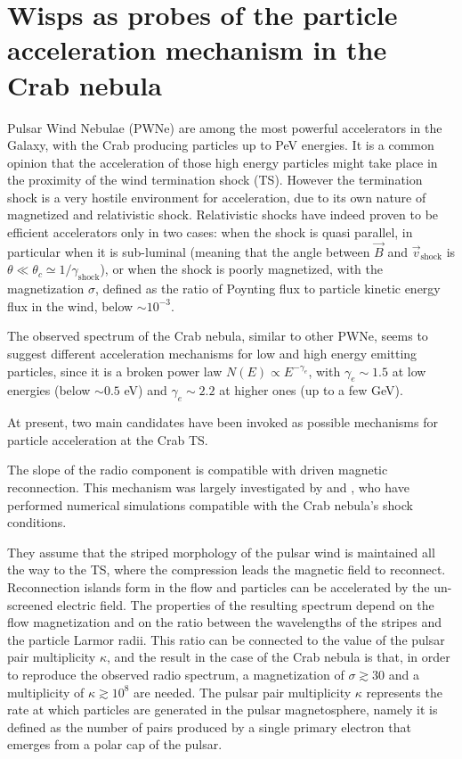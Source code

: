 \section{Wisps as probes of the particle acceleration mechanism in the Crab nebula}
Pulsar Wind Nebulae (PWNe) are among the most powerful accelerators in the Galaxy, with the Crab producing particles up to PeV energies. 
It is a common opinion that the acceleration of those high energy particles might take place in the proximity of the wind termination shock (TS). However the termination shock is a very hostile environment for acceleration, due to its own nature of magnetized and relativistic shock. 
Relativistic shocks have indeed proven to be efficient accelerators only in two cases: when the shock is quasi parallel, in particular when it is sub-luminal (meaning that the angle between $\vec{B}$ and $\vec{v}_\mathrm{shock}$ is $\theta\ll\theta_c\simeq 1/\gamma_\mathrm{shock}$), or when the shock is poorly magnetized, with the magnetization $\sigma$, defined as the ratio of Poynting flux to particle kinetic energy flux in the wind, below $\sim 10^{-3}$.

The observed spectrum of the Crab nebula, similar to other PWNe, seems to suggest different acceleration mechanisms for low and high energy emitting particles, since it is a broken power law $N(E)\propto E^{-\gamma_e}$, with $\gamma_e\sim 1.5$ at low energies (below $\sim 0.5$ eV) and $\gamma_e\sim 2.2$ at higher ones (up to a few GeV).

At present, two main candidates have been invoked as possible mechanisms for particle acceleration at the Crab TS.

The slope of the radio component is compatible with driven magnetic reconnection. 
This mechanism was largely investigated by \citet{Sironi:2011} and \citet{Sironi:2013}, who have performed numerical simulations compatible with the Crab nebula's shock conditions. 

They assume that the striped morphology of the pulsar wind is maintained all the way to the TS, where the compression leads the magnetic field to reconnect. 
Reconnection islands form in the flow and particles can be accelerated by the un-screened electric field. 
The properties of the resulting spectrum depend on the flow magnetization and on the ratio between the wavelengths of the stripes and the particle Larmor radii. 
This ratio can be connected to the value of the pulsar pair multiplicity $\kappa$, and the result in the case of the Crab nebula is that, in order to reproduce the observed radio spectrum, a magnetization of $\sigma\gtrsim 30$ and a multiplicity of $\kappa \gtrsim 10^8$ are needed. The pulsar pair multiplicity $\kappa$ represents the rate at which particles are generated in the pulsar magnetosphere, namely it is defined as the number of pairs produced by a single primary electron that emerges from a polar cap of the pulsar. 


